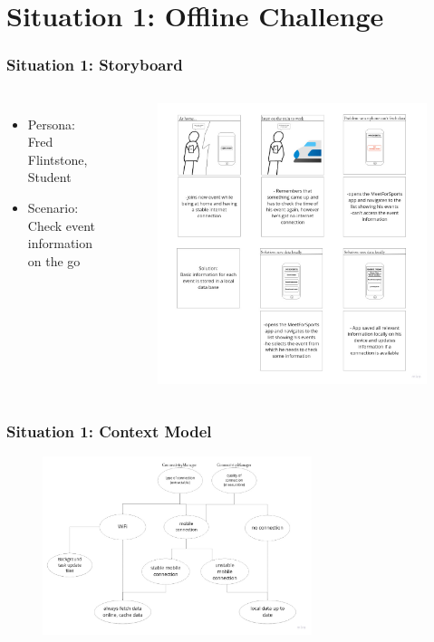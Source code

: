 \documentclass[aspectratio=169]{beamer}
\begin{document}
\section{Situation 1:  Offline Challenge}
\begin{frame}   
	\frametitle{Situation 1:  Storyboard}
	\begin{columns}
		\begin{itemize}
			\item Persona: Fred Flintstone, Student
			\item Scenario: Check event information on the go
		\end{itemize}
		 \begin{figure}
			\centering
			\includegraphics[width=1\textwidth]{media/storyboard1.jpg}
		\end{figure}
	\end{columns}
\end{frame}

\begin{frame}
	\frametitle{Situation 1: Context Model}
	 \begin{figure}
		\centering
		\includegraphics[width=0.7\textwidth]{media/contextmodel1.jpg}
	\end{figure}
\end{frame}
\end{document}
